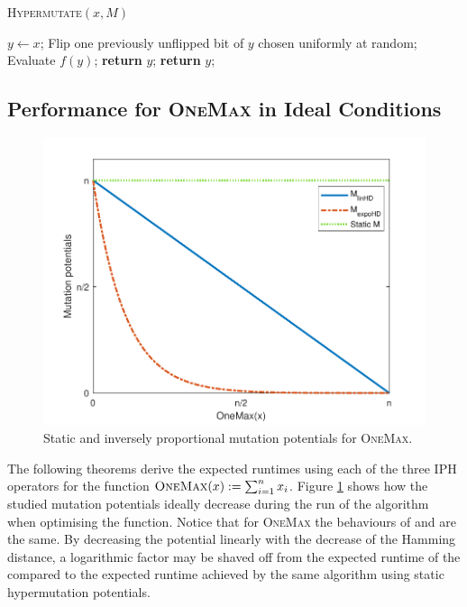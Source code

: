 \documentclass[lettersize,journal]{IEEEtran}
\begin{document}
\begin{algorithm}[t]

	\caption{\textsc{Hypermutate}$(x,M)$}
	\begin{algorithmic}[1]
{\color{blue}
		\STATE $y \gets x$;
		\STATE Flip one previously unflipped bit of $y$ chosen uniformly at random;
		\STATE Evaluate $f(y)$;
		\STATE \textbf{return} $y$;
		\ENDIF
		\ENDFOR
		\STATE \textbf{return} $y$;     
	}
	\end{algorithmic}
	\label{alg:hypermutate}
\end{algorithm}


\subsection{Performance for \textsc{OneMax} in Ideal Conditions}
\begin{figure}[t!]
\centering
\includegraphics[width=\columnwidth]{a}
\caption{Static and inversely proportional mutation potentials for \textsc{OneMax}.}
\label{fig:onemax}
\end{figure}

The following theorems derive the expected runtimes using each of the three IPH operators for the function $\textsc{OneMax}(x):=\sum_{i=1}^{n}x_i$. 
Figure \ref{fig:onemax} %
shows how the studied mutation potentials ideally decrease during the run of the algorithm when optimising the function. 
Notice that for \textsc{OneMax} the behaviours of   {\expoF } and {\expoHD }  are the same. %
By decreasing the potential linearly with the decrease of the Hamming distance, a logarithmic factor may be shaved off from the expected runtime of the {\oneoneIA } compared to the expected runtime achieved by the same algorithm using static hypermutation potentials.
\end{document}
